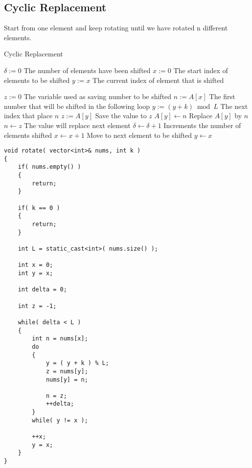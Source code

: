 \subsection{Cyclic Replacement}
Start from one element and keep rotating until we have rotated n different elements.
\setcounter{algorithm}{0}
\begin{algorithm}[H]
\caption{Cyclic Replacement}
\begin{algorithmic}[1]
\State $\delta:=0$ \Comment The number of elements have been shifted
\State $x:=0$ \Comment The start index of elements to be shifted
\State $y:=x$ \Comment The current index of element that is shifted
\end{algorithmic}
\end{algorithm}
\begin{algorithm}[H]
\begin{algorithmic}[1]
\State $z:=0$ \Comment The variable used as saving number to be shifted
\State $n:=A[x]$ \Comment The first number that will be shifted in the following loop
\Repeat
\State $y:=(y+k)\bmod L$ \Comment The next index that place $n$
\State $z:=A[y]$ \Comment Save the value to $z$
\State $A[y]\gets n$ \Comment Replace $A[y]$ by $n$
\State $n\gets z$ \Comment The value will replace next element
\State $\delta\gets\delta+1$ \Comment Increments the number of elements shifted
\EndWhile
\State $x\gets x+1$ \Comment Move to next element to be shifted
\State $y\gets x$
\EndProcedure
\end{algorithmic}
\end{algorithm}
\setcounter{lstlisting}{0}
\begin{lstlisting}[style=customc, caption={Cyclic Replacement Code}]
void rotate( vector<int>& nums, int k )
{
    if( nums.empty() )
    {
        return;
    }

    if( k == 0 )
    {
        return;
    }

    int L = static_cast<int>( nums.size() );

    int x = 0;
    int y = x;

    int delta = 0;

    int z = -1;

    while( delta < L )
    {
        int n = nums[x];
        do
        {
            y = ( y + k ) % L;
            z = nums[y];
            nums[y] = n;

            n = z;
            ++delta;
        }
        while( y != x );

        ++x;
        y = x;
    }
}
\end{lstlisting}
